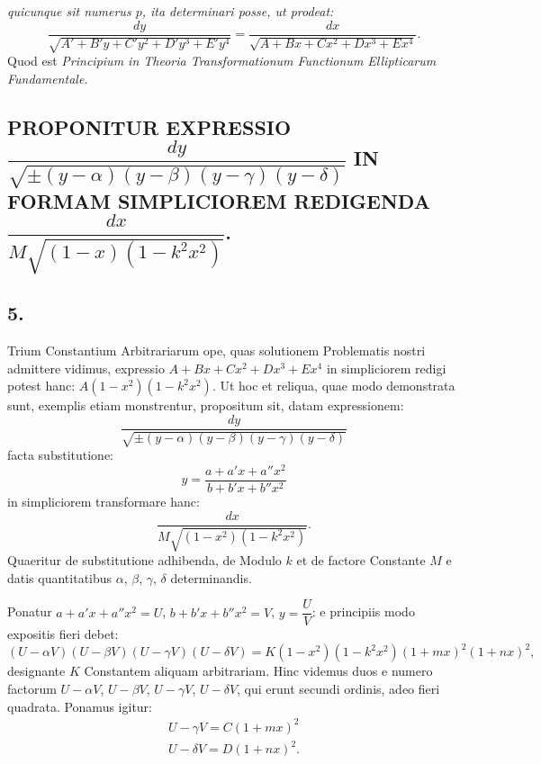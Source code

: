 \documentclass{article}
\begin{document}
\emph{quicunque sit numerus $p$, ita determinari posse, ut prodeat:}
\[
\frac{dy}{\sqrt{A'+B'y+C'y^{2}+D'y^{3}+E'y^{4}}}=\frac{dx}{\sqrt{A+Bx+Cx^{2}+Dx^{3}+Ex^{4}}}.
\]
Quod est \emph{Principium in Theoria Transformationum Functionum Ellipticarum Fundamentale.}

\subsection*{PROPONITUR EXPRESSIO $\dfrac{dy}{\sqrt{\pm(y-\alpha)(y-\beta)(y-\gamma)(y-\delta)}}$ IN FORMAM SIMPLICIOREM REDIGENDA $\dfrac{dx}{M\sqrt{(1-x)(1-k^{2}x^{2})}}$.}

\subsection*{5.}

Trium Constantium Arbitrariarum ope, quas solutionem Problematis nostri admittere vidimus, expressio $A+Bx+Cx^{2}+Dx^{3}+Ex^{4}$ in simpliciorem redigi potest hanc: $A(1-x^{2})(1-k^{2}x^{2})$. Ut hoc et reliqua, quae modo demonstrata sunt, exemplis etiam monstrentur, propositum sit, datam expressionem:
\[
\frac{dy}{\sqrt{\pm(y-\alpha)(y-\beta)(y-\gamma)(y-\delta)}}
\]
facta substitutione:
\[
y=\frac{a+a'x+a''x^{2}}{b+b'x+b''x^{2}}
\]
in simpliciorem transformare hanc:
\[
\frac{dx}{M\sqrt{(1-x^{2})(1-k^{2}x^{2})}}.
\]
Quaeritur de substitutione adhibenda, de Modulo $k$ et de factore Constante $M$ e datis quantitatibus $\alpha$, $\beta$, $\gamma$, $\delta$ determinandis.

Ponatur $a+a'x+a''x^{2}=U$, $b+b'x+b''x^{2}=V$, $y=\dfrac{U}{V}$: e principiis modo expositis fieri debet:
\[
(U-\alpha V)(U-\beta V)(U-\gamma V)(U-\delta V)=K(1-x^{2})(1-k^{2}x^{2})(1+mx)^{2}(1+nx)^{2},
\]
designante $K$ Constantem aliquam arbitrariam. Hinc videmus duos e numero factorum $U-\alpha V$, $U-\beta V$, $U-\gamma V$, $U-\delta V$, qui erunt secundi ordinis, adeo fieri quadrata. Ponamus igitur:
\[
\begin{gathered}
U-\gamma V=C(1+mx)^{2}\\
U-\delta V=D(1+nx)^{2}.
\end{gathered}
\]

\end{document}
